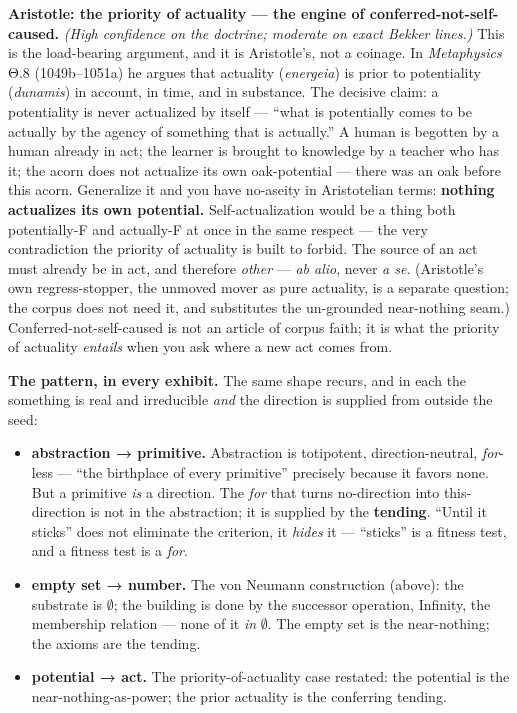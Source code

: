 \documentclass[11pt]{article}
\begin{document}
\textbf{Aristotle: the priority of actuality — the engine of conferred-not-self-caused.} \emph{(High confidence on the doctrine; moderate on exact Bekker lines.)} This is the load-bearing argument, and it is Aristotle's, not a coinage. In \emph{Metaphysics} Θ.8 (1049b–1051a) he argues that actuality (\emph{energeia}) is prior to potentiality (\emph{dunamis}) in account, in time, and in substance. The decisive claim: a potentiality is never actualized by itself — ``what is potentially comes to be actually by the agency of something that is actually.'' A human is begotten by a human already in act; the learner is brought to knowledge by a teacher who has it; the acorn does not actualize its own oak-potential — there was an oak before this acorn. Generalize it and you have no-aseity in Aristotelian terms: \textbf{nothing actualizes its own potential.} Self-actualization would be a thing both potentially-F and actually-F at once in the same respect — the very contradiction the priority of actuality is built to forbid. The source of an act must already be in act, and therefore \emph{other} — \emph{ab alio}, never \emph{a se}. (Aristotle's own regress-stopper, the unmoved mover as pure actuality, is a separate question; the corpus does not need it, and substitutes the un-grounded near-nothing seam.) Conferred-not-self-caused is not an article of corpus faith; it is what the priority of actuality \emph{entails} when you ask where a new act comes from.

\textbf{The pattern, in every exhibit.} The same shape recurs, and in each the something is real and irreducible \emph{and} the direction is supplied from outside the seed:

\begin{itemize}
\item \textbf{abstraction → primitive.} Abstraction is totipotent, direction-neutral, \emph{for}-less — ``the birthplace of every primitive'' precisely because it favors none. But a primitive \emph{is} a direction. The \emph{for} that turns no-direction into this-direction is not in the abstraction; it is supplied by the \textbf{tending}. ``Until it sticks'' does not eliminate the criterion, it \emph{hides} it — ``sticks'' is a fitness test, and a fitness test is a \emph{for}.
\item \textbf{empty set → number.} The von Neumann construction (above): the substrate is \ensuremath{\emptyset}; the building is done by the successor operation, Infinity, the membership relation — none of it \emph{in} \ensuremath{\emptyset}. The empty set is the near-nothing; the axioms are the tending.
\item \textbf{potential → act.} The priority-of-actuality case restated: the potential is the near-nothing-as-power; the prior actuality is the conferring tending.
\end{itemize}
\end{document}
